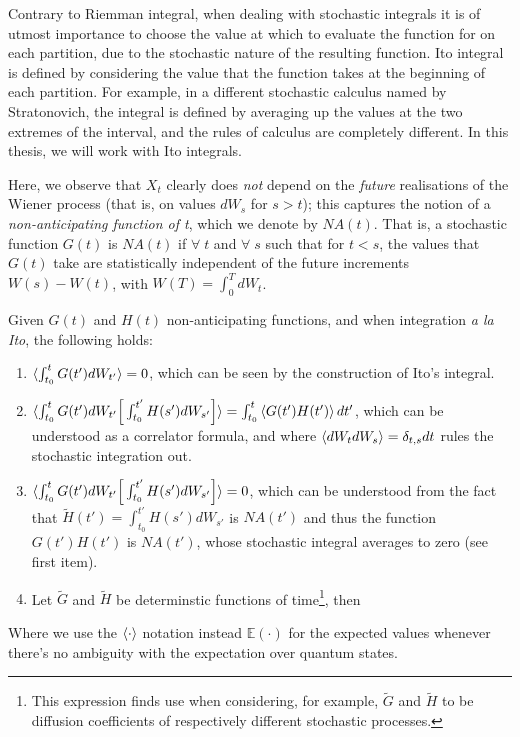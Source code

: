 Contrary to Riemman integral, when dealing with stochastic integrals it is of utmost importance to choose the value at which to evaluate the function for on each partition, due to the stochastic nature of the resulting function. Ito integral is defined by considering the value that the function takes at the beginning of each partition. For example, in a different stochastic calculus named by Stratonovich, the integral is defined by averaging up the values at the two extremes of the interval, and the rules of calculus are completely different. In this thesis, we will work with Ito integrals.

Here, we observe that $X_t$ clearly does \textit{not} depend on the \textit{future} realisations of the Wiener process (that is, on values $dW_s$ for $s>t$); this captures the notion of a \textit{non-anticipating function of t}, which we denote by $NA(t)$. That is, a stochastic function $G(t)$ is $NA(t)$ if $\forall\;t$ and $\forall \; s$ such that for $t<s$, the values that $G(t)$ take are statistically independent of the future increments $W(s) - W(t)$, with $W(T) = \int_0^T dW_t$.

Given $G(t)$ and $H(t)$ non-anticipating functions, and when integration \textit{a la Ito}, the following holds:
\begin{enumerate}
\item $\mathinner{\langle \int_{t_0}^tG(t')dW_{t'}\rangle} = 0$, which can be seen by the construction of Ito's integral.
\item $\mathinner{\langle \int_{t_0}^t G(t')dW_{t'} \Big[\int_{t_0}^{t'} H(s') dW_{s'}\Big]\rangle} = \int_{t_0}^t \mathinner{\langle G(t') H(t')\rangle} dt'$, which can be understood as a correlator formula, and where $\mathinner{\langle dW_t dW_s\rangle} = \delta_{t,s} dt$ rules the stochastic integration out.
\item $\mathinner{\langle \int_{t_0}^t G(t')dW_{t'} \Big[\int_{t_0}^{t'} H(s') dW_{s'} \Big]\rangle} = 0$, which can be understood from the fact that $\tilde{H}(t') = \int_{t_0}^{t'} H(s') dW_{s'}$ is $NA(t')$ and thus the function $G(t')H(t')$ is $NA(t')$, whose stochastic integral averages to zero (see first item).
\item Let $\tilde{G}$ and $\tilde{H}$ be determinstic functions of time\footnote{This expression finds use when considering, for example, $\tilde{G}$ and $\tilde{H}$ to be diffusion coefficients of respectively different stochastic processes.}, then 
\end{enumerate}
Where we use the $\mathinner{\langle \cdot\rangle}$ notation instead $\mathbb{E}(\cdot)$ for the expected values whenever there's no ambiguity with the expectation over quantum states.

